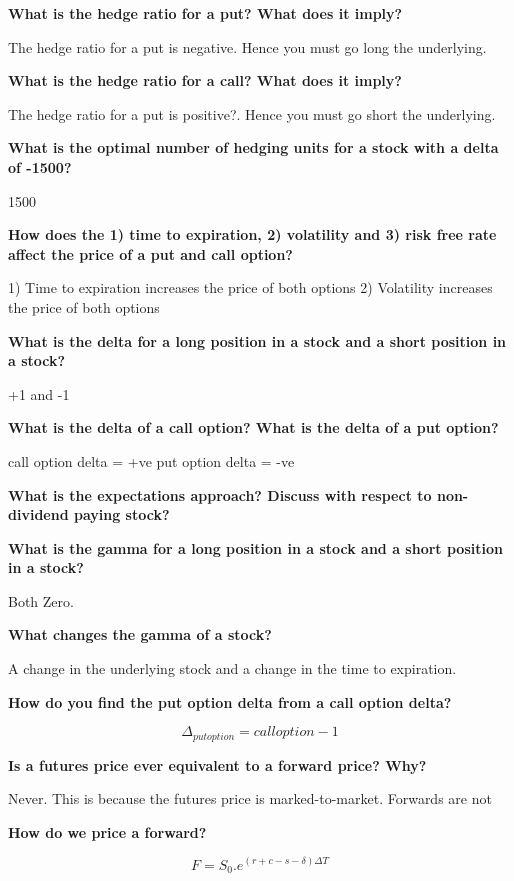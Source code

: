 \documentclass[12pt]{article}
\begin{document}
\begin{framed}
	\textbf{What is the hedge ratio for a put? What does it imply?}
	
	The hedge ratio for a put is negative. Hence you must go long the underlying.
	
		\textbf{What is the hedge ratio for a call? What does it imply?}
	
	The hedge ratio for a put is positive?. Hence you must go short the underlying.
	
	\textbf{What is the optimal number of hedging units for a stock with a delta of -1500?}
	
	1500
	
	\textbf{How does the 1) time to expiration, 2) volatility and 3) risk free rate affect the price of a put and call option?}
	
	1) Time to expiration increases the price of both options
	2) Volatility increases the price of both options
	
	\textbf{What is the delta for a long position in a stock and a short position in a stock?}
	
	+1 and -1

	
	\textbf{What is the delta of a call option? What is the delta of a put option?}
	
	call option delta = +ve
	put option delta = -ve
	
	\textbf{What is the expectations approach? Discuss with respect to non-dividend paying stock?}
	
	
	
	\textbf{What is the gamma for a long position in a stock and a short position in a stock?}
	
	Both Zero.
	
	\textbf{What changes the gamma of a stock?}
	
	A change in the underlying stock and a change in the time to expiration.
	
	\textbf{How do you find the put option delta from a call option delta?}
	
	$$
	\Delta_{put option} = {call option}  - 1
	$$
	
	\textbf{Is a futures price ever equivalent to a forward price? Why?}
	
	Never. This is because the futures price is marked-to-market. Forwards are not
	
	\textbf{How do we price a forward?}
	
	$$
	F = S_0 . e^{(r + c - s  -\delta)\Delta T}
	$$
	

\end{framed}
\end{document}
